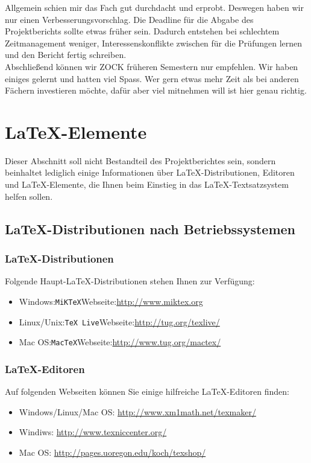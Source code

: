 \documentclass[12pt,a4paper,bibliography=totocnumbered,listof=totocnumbered]{scrartcl}
\begin{document}
	Allgemein schien mir das Fach gut durchdacht und erprobt. Deswegen haben wir nur einen Verbesserungsvorschlag. Die Deadline für die Abgabe des Projektberichts sollte etwas früher sein. Dadurch entstehen bei schlechtem Zeitmanagement weniger, Interessenskonflikte zwischen für die Prüfungen lernen und den Bericht fertig schreiben.\\
	Abschließend können wir \glqq ZOCK \grqq{} früheren Semestern nur empfehlen. Wir haben einiges gelernt und hatten viel Spass. Wer gern etwas mehr Zeit als bei anderen Fächern investieren möchte, dafür aber viel mitnehmen will ist hier genau richtig.

    \newpage
    
    
    \section{\LaTeX-Elemente}
    Dieser Abschnitt soll nicht Bestandteil des Projektberichtes sein, sondern beinhaltet lediglich einige Informationen über \LaTeX-Distributionen, Editoren und \LaTeX-Elemente, die Ihnen beim Einstieg in das \LaTeX-Textsatzsystem helfen sollen.

    \subsection{\LaTeX-Distributionen nach Betriebssystemen}

    \subsubsection{\LaTeX-Distributionen}
    Folgende Haupt-\LaTeX-Distributionen stehen Ihnen zur Verfügung:
    \begin{itemize}
        \item Windows:\quad \texttt{MiKTeX}\quad Webseite:\quad\url{http://www.miktex.org}
        \item Linux/Unix:\quad \texttt{TeX Live}\quad Webseite:\quad\url{http://tug.org/texlive/}
        \item Mac OS:\quad \texttt{MacTeX}\quad Webseite:\quad\url{http://www.tug.org/mactex/}
    \end{itemize}

    \subsubsection{\LaTeX-Editoren}
    Auf folgenden Webseiten können Sie einige hilfreiche \LaTeX-Editoren finden:
    \begin{itemize}
        \item Windows/Linux/Mac OS: \url{http://www.xm1math.net/texmaker/}
        \item Windiws: \url{http://www.texniccenter.org/}
        \item Mac OS: \url{http://pages.uoregon.edu/koch/texshop/}
    \end{itemize}
\end{document}
